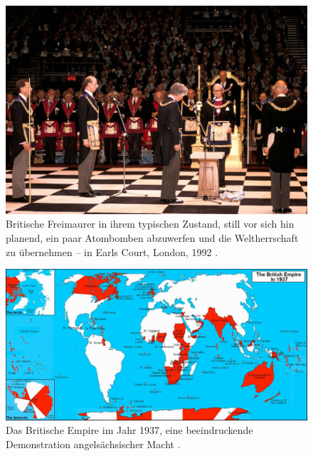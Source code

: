 \documentclass[10pt,twocolumn,letterpaper]{article}
\begin{document}
\begin{figure}[b]
\begin{center}

\includegraphics[width=1\linewidth]{freemason.jpg}
\end{center}
   \caption{Britische Freimaurer in ihrem typischen Zustand, still vor sich hin planend, ein paar Atombomben abzuwerfen und die Weltherrschaft zu übernehmen – in Earls Court, London, 1992 \cite{5}.}
\label{fig:1}
\label{fig:onecol}
\end{figure}

\begin{figure}[t]
\begin{center}
\includegraphics[width=1\textwidth]{british.jpg}
\end{center}
   \caption{Das Britische Empire im Jahr 1937, eine beeindruckende Demonstration angelsächsischer Macht \cite{14}.}
   \label{fig:2}
\end{figure}
\end{document}
